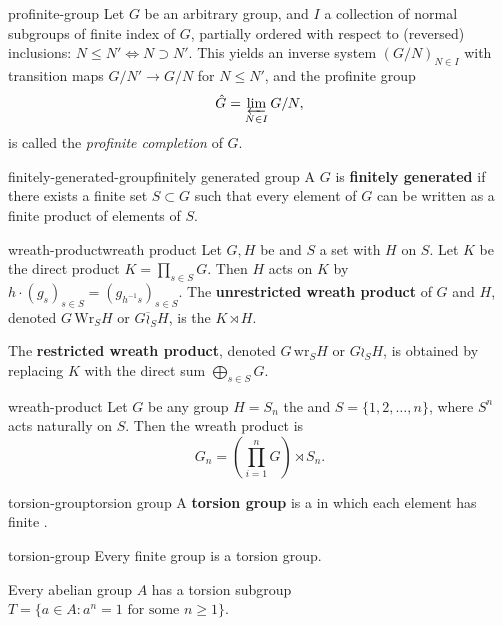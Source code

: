 \begin{example}{profinite-group}
    Let $G$ be an arbitrary group, and $I$ a collection of normal subgroups of finite index of $G$, partially ordered with respect to (reversed) inclusions: $N \le N' \iff N \supset N'$. This yields an inverse system $(G / N)_{N \in I}$ with transition maps $G/N' \to G/N$ for $N \le N'$, and the profinite group
    \[ \hat{G} = \varprojlim_{N \in I} G / N ,\]
    is called the \textit{profinite completion} of $G$.
\end{example}

\begin{topic}{finitely-generated-group}{finitely generated group}
    A  $G$ is \textbf{finitely generated} if there exists a finite set $S \subset G$ such that every element of $G$ can be written as a finite product of elements of $S$.
\end{topic}

\begin{topic}{wreath-product}{wreath product}
    Let $G, H$ be  and $S$ a set with $H$  on $S$. Let $K$ be the direct product $K = \prod_{s \in S} G$. Then $H$ acts on $K$ by $h \cdot (g_s)_{s \in S} = (g_{h^{-1} s})_{s \in S}$. The \textbf{unrestricted wreath product} of $G$ and $H$, denoted $G \, \text{Wr}_S H$ or $G \overline{\wr}_S H$, is the  $K \rtimes H$.
    
    The \textbf{restricted wreath product}, denoted $G \, \text{wr}_S H$ or $G \wr_S H$, is obtained by replacing $K$ with the direct sum $\bigoplus_{s \in S} G$.
\end{topic}

\begin{example}{wreath-product}
    Let $G$ be any group $H = S_n$ the  and $S = \{ 1, 2, \ldots, n \}$, where $S^n$ acts naturally on $S$. Then the wreath product is
    \[ G_n = \left( \prod_{i = 1}^{n} G \right) \rtimes S_n . \]
\end{example}

\begin{topic}{torsion-group}{torsion group}
    A \textbf{torsion group} is a  in which each element has finite .
\end{topic}

\begin{example}{torsion-group}
    Every finite group is a torsion group.
    
    Every abelian group $A$ has a torsion subgroup $T = \{ a \in A : a^n = 1 \text{ for some } n \ge 1 \}$.
\end{example}

